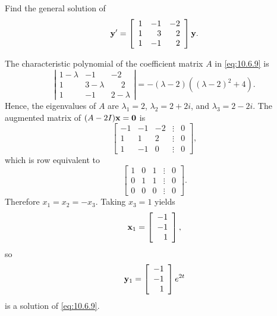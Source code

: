 \begin{example}
  \label{example:10.6.4} \rm Find the general solution of
  \begin{equation}
    \label{eq:10.6.9}{\bf y}'=\left[\begin{array}{rrr} 1&-1&-2\\1&3&2\\1&-1&2\end{array}\right]{\bf y}.
  \end{equation}
\end{example}

\begin{examplesolution}
\solution The characteristic polynomial of the coefficient matrix $A$ in \eqref{eq:10.6.9} is
\[
  \left|
  \begin{array}{ccc}
    1-\lambda & -1        & -2           \\
    1         & 3-\lambda & \phantom{-}2 \\
    1         & -1        & 2-\lambda
  \end{array}\right|= -(\lambda-2)\left((\lambda-2)^{2}+4\right).
\]
Hence, the eigenvalues of $A$ are $\lambda_{1}=2$, $\lambda_{2}=2+2i$, and $\lambda_{3}=2-2i$. The
augmented matrix of $(A-2I){\bf x=0}$ is
\[
  \left[
  \begin{array}{rrrcr}
    -1 & -1 & -2 & \vdots & 0 \\
    1  & 1  & 2  & \vdots & 0 \\
    1  & -1 & 0  & \vdots & 0
  \end{array}\right],
\]
which is row equivalent to
\[
  \left[
  \begin{array}{rrrcr}
    1 & 0 & 1 & \vdots & 0 \\
    0 & 1 & 1 & \vdots & 0 \\
    0 & 0 & 0 & \vdots & 0
  \end{array}\right].
\]
Therefore $x_{1}=x_{2}=-x_{3}$. Taking $x_{3}=1$ yields
\[
  {\bf x}_{1}=\left[\begin{array}{r}-1\\-1\\1\end{array}\right],
\]
so
\[
  {\bf y}_{1}=\left[\begin{array}{r}-1\\-1\\1\end{array}\right]e^{2t}
\]
is a solution of \eqref{eq:10.6.9}.


\end{examplesolution}
